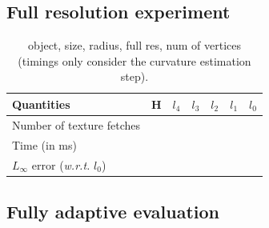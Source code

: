 \documentclass{llncs}
\newcommand{\wrt}{\emph{w.r.t.} }
\begin{document}
\subsection{Full resolution experiment}


\begin{table}
  \begin{center}
    \begin{tabular}{@{}lrrrrrr@{}}
      \toprule
    Quantities & H & $l_4$ & $l_3$ & $l_2$ & $l_1$ & $l_0$\\
      \midrule
      Number of texture fetches & & & & & &\\
      Time (in ms) & & & & & &\\
      $L_\infty$ error (\wrt $l_0$) & & & & & &\\
      \bottomrule
    \end{tabular}
  \end{center}
  \caption{object, size, radius, full res, num of vertices (timings
    only consider the curvature estimation step).\label{tab:full-res-stat}}
\end{table}




\subsection{Fully adaptive evaluation}
\end{document}
